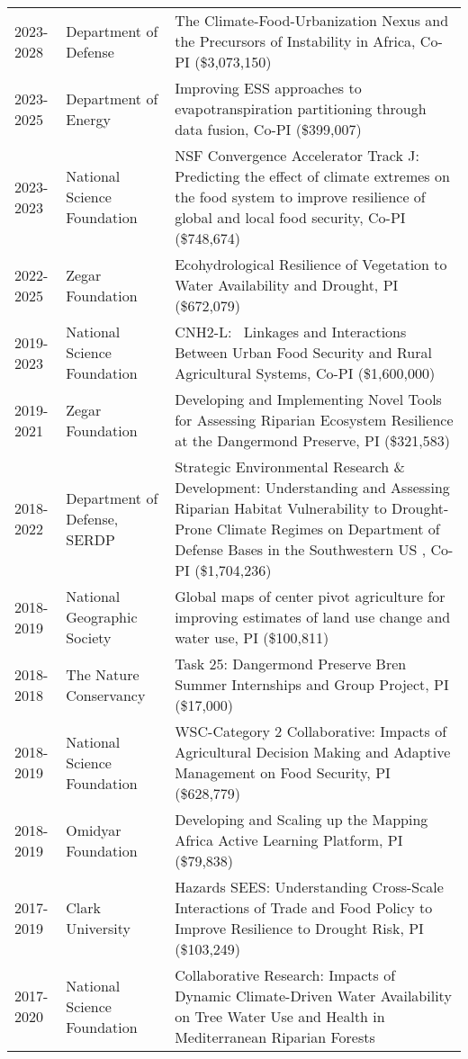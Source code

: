 \begin{longtable}{p{1.75cm}>{\raggedright}p{}p{6cm}}
2023-2028 & Department of Defense & The Climate-Food-Urbanization Nexus and the Precursors of Instability in Africa, Co-PI (\$3,073,150) \\ 
2023-2025 & Department of Energy & Improving ESS approaches to evapotranspiration partitioning through data fusion, Co-PI (\$399,007) \\ 
2023-2023 & National Science Foundation & NSF Convergence Accelerator Track J: Predicting the effect of climate extremes on the food system to improve resilience of global and local food security, Co-PI (\$748,674) \\ 
2022-2025 & Zegar Foundation & Ecohydrological Resilience of Vegetation to Water Availability and Drought, PI (\$672,079) \\ 
2019-2023 & National Science Foundation & CNH2-L:  Linkages and Interactions Between Urban Food Security and Rural Agricultural Systems, Co-PI (\$1,600,000) \\ 
2019-2021 & Zegar Foundation & Developing and Implementing Novel Tools for Assessing Riparian Ecosystem Resilience at the Dangermond Preserve, PI (\$321,583) \\ 
2018-2022 & Department of Defense, SERDP & Strategic Environmental Research \& Development: Understanding and Assessing Riparian Habitat Vulnerability to Drought-Prone Climate Regimes on Department of Defense Bases in the Southwestern US 
, Co-PI (\$1,704,236) \\ 
2018-2019 & National Geographic Society & Global maps of center pivot agriculture for improving estimates of land use change and water use, PI (\$100,811) \\ 
2018-2018 & The Nature Conservancy & Task 25: Dangermond Preserve Bren Summer Internships and Group Project, PI (\$17,000) \\ 
2018-2019 & National Science Foundation & WSC-Category 2 Collaborative: Impacts of Agricultural Decision Making and Adaptive Management on Food Security, PI (\$628,779) \\ 
2018-2019 & Omidyar Foundation & Developing and Scaling up the Mapping Africa Active Learning Platform, PI (\$79,838) \\ 
2017-2019 & Clark University & Hazards SEES: Understanding Cross-Scale Interactions of Trade and Food Policy to Improve Resilience to Drought Risk, PI (\$103,249) \\ 
2017-2020 & National Science Foundation & Collaborative Research: Impacts of Dynamic Climate-Driven Water Availability on Tree Water Use and Health in Mediterranean Riparian Forests 

\end{longtable}

